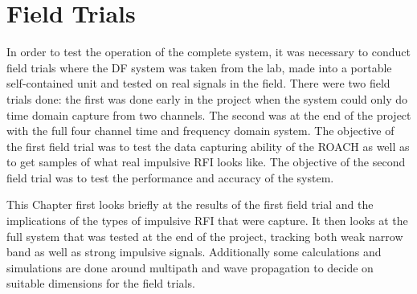 \chapter{Field Trials}
\label{ch:field-trials}
\graphicspath{{./img/field-trials/}}

In order to test the operation of the complete system, it was necessary to conduct field trials where the DF system was taken from the lab, made into a portable self-contained unit and tested on real signals in the field. There were two field trials done: the first was done early in the project when the system could only do time domain capture from two channels. The second was at the end of the project with the full four channel time and frequency domain system. The objective of the first field trial was to test the data capturing ability of the ROACH as well as to get samples of what real impulsive RFI looks like. The objective of the second field trial was to test the performance and accuracy of the system.

This Chapter first looks briefly at the results of the first field trial and the implications of the types of impulsive RFI that were capture. It then looks at the full system that was tested at the end of the project, tracking both weak narrow band as well as strong impulsive signals. Additionally some calculations and simulations are done around multipath and wave propagation to decide on suitable dimensions for the field trials.






